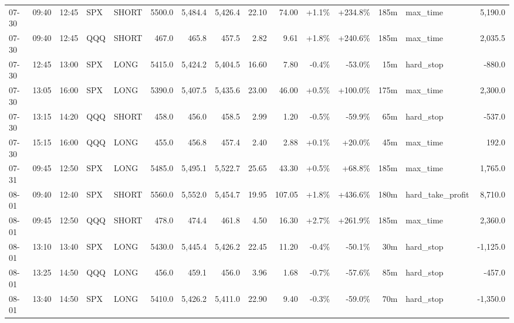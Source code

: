 \documentclass[11pt,a4paper,twoside]{article}
\begin{document}
\begin{landscape}
\begin{center}
\begin{longtable}{>{\color{txtmain}}l l l l l r r r r r r r r >{\color{txtmain}}l r}
07-30 & 09:40 & 12:45 & SPX & SHORT & 5500.0 & 5,484.4 & 5,426.4 & 22.10 & 74.00 & \textcolor{wingreen}{+1.1\%} & \textcolor{wingreen}{+234.8\%} & 185m & max\_time & \textcolor{wingreen}{5,190.0} \\
07-30 & 09:40 & 12:45 & QQQ & SHORT & 467.0 & 465.8 & 457.5 & 2.82 & 9.61 & \textcolor{wingreen}{+1.8\%} & \textcolor{wingreen}{+240.6\%} & 185m & max\_time & \textcolor{wingreen}{2,035.5} \\
07-30 & 12:45 & 13:00 & SPX & LONG & 5415.0 & 5,424.2 & 5,404.5 & 16.60 & 7.80 & \textcolor{lossred}{-0.4\%} & \textcolor{lossred}{-53.0\%} & 15m & hard\_stop & \textcolor{lossred}{-880.0} \\
07-30 & 13:05 & 16:00 & SPX & LONG & 5390.0 & 5,407.5 & 5,435.6 & 23.00 & 46.00 & \textcolor{wingreen}{+0.5\%} & \textcolor{wingreen}{+100.0\%} & 175m & max\_time & \textcolor{wingreen}{2,300.0} \\
07-30 & 13:15 & 14:20 & QQQ & SHORT & 458.0 & 456.0 & 458.5 & 2.99 & 1.20 & \textcolor{lossred}{-0.5\%} & \textcolor{lossred}{-59.9\%} & 65m & hard\_stop & \textcolor{lossred}{-537.0} \\
07-30 & 15:15 & 16:00 & QQQ & LONG & 455.0 & 456.8 & 457.4 & 2.40 & 2.88 & \textcolor{wingreen}{+0.1\%} & \textcolor{wingreen}{+20.0\%} & 45m & max\_time & \textcolor{wingreen}{192.0} \\
07-31 & 09:45 & 12:50 & SPX & LONG & 5485.0 & 5,495.1 & 5,522.7 & 25.65 & 43.30 & \textcolor{wingreen}{+0.5\%} & \textcolor{wingreen}{+68.8\%} & 185m & max\_time & \textcolor{wingreen}{1,765.0} \\
08-01 & 09:40 & 12:40 & SPX & SHORT & 5560.0 & 5,552.0 & 5,454.7 & 19.95 & 107.05 & \textcolor{wingreen}{+1.8\%} & \textcolor{wingreen}{+436.6\%} & 180m & hard\_take\_profit & \textcolor{wingreen}{8,710.0} \\
08-01 & 09:45 & 12:50 & QQQ & SHORT & 478.0 & 474.4 & 461.8 & 4.50 & 16.30 & \textcolor{wingreen}{+2.7\%} & \textcolor{wingreen}{+261.9\%} & 185m & max\_time & \textcolor{wingreen}{2,360.0} \\
08-01 & 13:10 & 13:40 & SPX & LONG & 5430.0 & 5,445.4 & 5,426.2 & 22.45 & 11.20 & \textcolor{lossred}{-0.4\%} & \textcolor{lossred}{-50.1\%} & 30m & hard\_stop & \textcolor{lossred}{-1,125.0} \\
08-01 & 13:25 & 14:50 & QQQ & LONG & 456.0 & 459.1 & 456.0 & 3.96 & 1.68 & \textcolor{lossred}{-0.7\%} & \textcolor{lossred}{-57.6\%} & 85m & hard\_stop & \textcolor{lossred}{-457.0} \\
08-01 & 13:40 & 14:50 & SPX & LONG & 5410.0 & 5,426.2 & 5,411.0 & 22.90 & 9.40 & \textcolor{lossred}{-0.3\%} & \textcolor{lossred}{-59.0\%} & 70m & hard\_stop & \textcolor{lossred}{-1,350.0} \\

\end{longtable}
\end{center}
\end{landscape}
\end{document}
